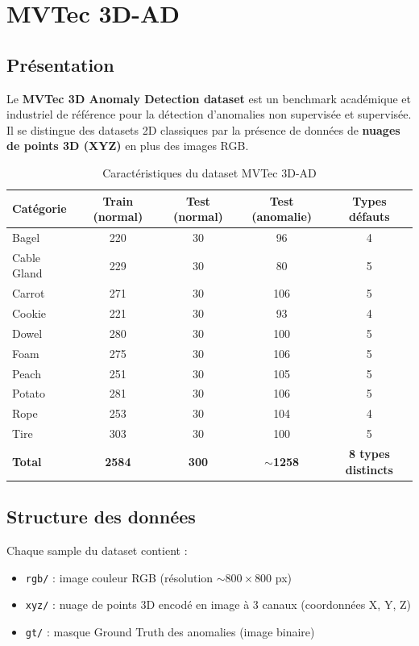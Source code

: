 \documentclass[12pt, a4paper]{report}
\begin{document}
\section{MVTec 3D-AD}

\subsection{Présentation}

Le \textbf{MVTec 3D Anomaly Detection dataset} \cite{mvtec3d} est un benchmark académique et industriel de référence pour la détection d'anomalies non supervisée et supervisée. Il se distingue des datasets 2D classiques par la présence de données de \textbf{nuages de points 3D (XYZ)} en plus des images RGB.

\begin{table}[H]
  \centering
  \caption{Caractéristiques du dataset MVTec 3D-AD}
  \label{tab:mvtec}
  \begin{tabular}{lcccc}
    \toprule
    \rowcolor{themebluevlight}
    \textbf{Catégorie} & \textbf{Train (normal)} & \textbf{Test (normal)} & \textbf{Test (anomalie)} & \textbf{Types défauts} \\
    \midrule
    Bagel       & 220 & 30 & 96  & 4 \\
    Cable Gland & 229 & 30 & 80  & 5 \\
    Carrot      & 271 & 30 & 106 & 5 \\
    Cookie      & 221 & 30 & 93  & 4 \\
    Dowel       & 280 & 30 & 100 & 5 \\
    Foam        & 275 & 30 & 106 & 5 \\
    Peach       & 251 & 30 & 105 & 5 \\
    Potato      & 281 & 30 & 106 & 5 \\
    Rope        & 253 & 30 & 104 & 4 \\
    Tire        & 303 & 30 & 100 & 5 \\
    \midrule
    \textbf{Total} & \textbf{2584} & \textbf{300} & \textbf{$\sim$1258} & \textbf{8 types distincts} \\
    \bottomrule
  \end{tabular}
\end{table}

\subsection{Structure des données}

Chaque sample du dataset contient :
\begin{itemize}
  \item \texttt{rgb/} : image couleur RGB (résolution $\sim 800 \times 800$ px)
  \item \texttt{xyz/} : nuage de points 3D encodé en image à 3 canaux (coordonnées X, Y, Z)
  \item \texttt{gt/} : masque Ground Truth des anomalies (image binaire)
\end{itemize}
\end{document}
